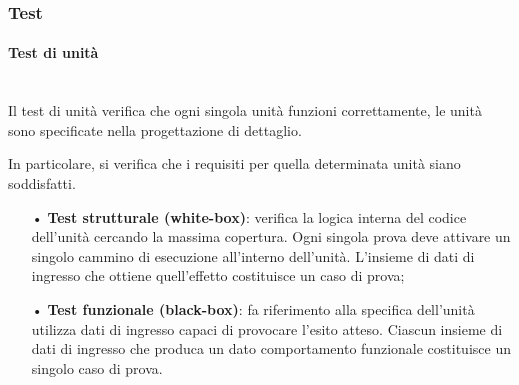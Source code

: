 \subsubsection{Test}

\paragraph{Test di unità}\mbox{}\\
Il test di unità verifica che ogni singola unità funzioni correttamente, le unità sono specificate nella progettazione di dettaglio.  

In particolare, si verifica che i requisiti per quella determinata unità siano soddisfatti.
\begin{itemize}
\item[•] \textbf{Test strutturale (white-box)}: verifica la logica interna del codice dell’unità cercando la massima copertura. Ogni singola prova deve attivare un singolo cammino di esecuzione all’interno dell’unità. L’insieme di dati di ingresso che ottiene quell’effetto costituisce un caso di prova;
\item[•] \textbf{Test funzionale (black-box)}: fa riferimento alla specifica dell'unità utilizza dati di ingresso capaci di provocare l'esito atteso. Ciascun insieme di dati di ingresso che produca un dato comportamento funzionale costituisce un singolo caso di prova.
\end{itemize}

